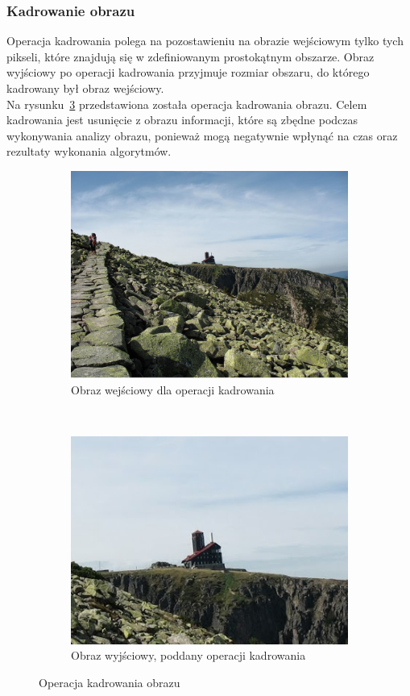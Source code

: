 \subsubsection{Kadrowanie obrazu}
Operacja kadrowania polega na pozostawieniu na obrazie wejściowym tylko tych pikseli, które znajdują się w zdefiniowanym prostokątnym obszarze. Obraz wyjściowy po operacji kadrowania przyjmuje rozmiar obszaru, do którego kadrowany był obraz wejściowy.\\
Na rysunku~\ref{fig:crop_image} przedstawiona została operacja kadrowania obrazu. Celem kadrowania jest usunięcie z obrazu informacji, które są zbędne podczas wykonywania analizy obrazu, ponieważ mogą negatywnie wpłynąć na czas oraz rezultaty wykonania algorytmów.
\begin{figure}
  \centering
  \begin{subfigure}[b]{0.45\textwidth}
    \includegraphics[width=\textwidth]{img/crop-image-before}
    \caption{Obraz wejściowy dla operacji kadrowania}
    \label{fig:crop_image_before}
  \end{subfigure}
  ~
  \begin{subfigure}[b]{0.45\textwidth}
    \includegraphics[width=\textwidth]{img/crop-image-after}
    \caption{Obraz wyjściowy, poddany operacji kadrowania}
    \label{fig:crop_image_after}
  \end{subfigure}
  \caption{Operacja kadrowania obrazu}\label{fig:crop_image}
\end{figure}
